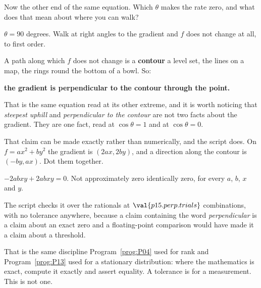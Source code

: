 \begin{fr}
Now the other end of the same equation. Which $\theta$ makes the rate zero,
and what does that mean about where you can walk?
\dotline
\nextframe
\end{fr}

\begin{fr}
\begin{ansblock}
$\theta = 90$ degrees. Walk at right angles to the gradient and $f$ does not
change at all, to first order.
\end{ansblock}

A path along which $f$ does not change is a \textbf{contour} \dash{} a level
set, the lines on a map, the rings round the bottom of a bowl. So:

\textbf{the gradient is perpendicular to the contour through the point.}

That is the same equation read at its other extreme, and it is worth noticing
that \emph{steepest uphill} and \emph{perpendicular to the contour} are not
two facts about the gradient. They are one fact, read at $\cos\theta = 1$ and
at $\cos\theta = 0$.
\end{fr}

\begin{fr}
That claim can be made exactly rather than numerically, and the script does.
On $f = ax^{2} + by^{2}$ the gradient is $(2ax, 2by)$, and a direction along
the contour is $(-by, ax)$. Dot them together.
\nextframe
\end{fr}

\begin{fr}
\begin{ansblock}
$-2abxy + 2abxy = 0$. Not approximately zero \dash{} identically zero, for
every $a$, $b$, $x$ and $y$.
\end{ansblock}

The script checks it over the rationals at $\val{p15.perp.trials}$
combinations, with no tolerance anywhere, because a claim containing the word
\emph{perpendicular} is a claim about an exact zero and a floating-point
comparison would have made it a claim about a threshold.

\begin{note}
That is the same discipline Program~\ref{prog:P04} used for rank and
Program~\ref{prog:P13} used for a stationary distribution: where the
mathematics is exact, compute it exactly and assert equality. A tolerance is
for a measurement. This is not one.
\end{note}
\end{fr}

